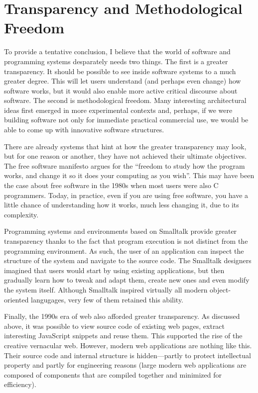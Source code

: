 \section{Transparency and Methodological Freedom}

To provide a tentative conclusion, I believe that the world of software and programming systems
desparately needs two things. The first is a greater transparency. It should be possible to see
inside software systems to a much greater degree. This will let users understand (and perhaps
even change) how software works, but it would also enable more active critical discourse
about software. The second is methodological freedom. Many interesting architectural ideas
first emerged in more experimental contexts and, perhaps, if we were building software not
only for immediate practical commercial use, we would be able to come up with innovative software
structures.

There are already systems that hint at how the greater transparency may look, but for one reason
or another, they have not achieved their ultimate objectives. The free software manifesto argues
for the ``freedom to study how the program works, and change it so it does your computing as you
wish''. This may have been the case about free software in the 1980s when
most users were also C programmers. Today, in practice, even if you are using free software,
you have a little chance of understanding how it works, much less changing it, due to its
complexity.

Programming systems and environments based on Smalltalk provide greater transparency thanks to
the fact that program execution is not distinct from the programming environment. As such, the
user of an application can inspect the structure of the system and navigate to the source code.
The Smalltalk designers imagined that users would start by using existing applications, but then
gradually learn how to tweak and adapt them, create new ones and even modify the system
itself.
Although Smalltalk inspired virtually all modern object-oriented langugages, very few of them
retained this ability.

Finally, the 1990s era of web also afforded greater transparency. As discussed above, it was
possible to view source code of existing web pages, extract interesting JavaScript snippets and
reuse them. This supported the rise of the creative vernacular web. However, modern web applications
are nothing like this. Their source code and internal structure is hidden---partly to protect
intellectual property and partly for engineering reasons (large modern web applications are
composed of components that are compiled together and minimized for efficiency).

